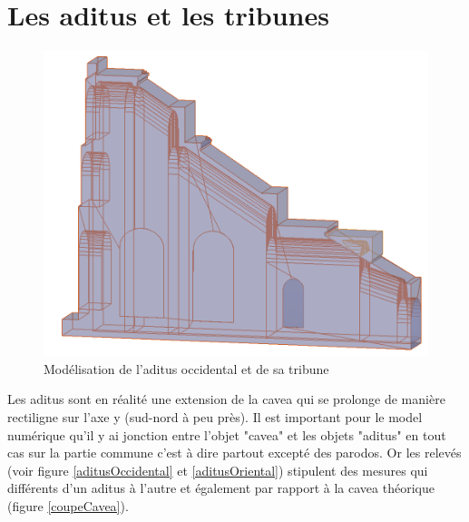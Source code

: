		
\section{Les \gls{aditus} et les tribunes} 

\begin{figure}[!h]
	\includegraphics[width=\linewidth]{images/modAditus}
	\caption{Modélisation de l'\gls{aditus} occidental et de sa tribune} 
	\label{modAditus} 
\end{figure}  
		
Les aditus sont en réalité une extension de la cavea qui se prolonge de manière rectiligne sur l'axe y (sud-nord à peu près). Il est important pour le model numérique qu'il y ai jonction entre l'objet "cavea" et les objets "aditus" en tout cas sur la partie commune c'est à dire partout excepté des \gls{parodos}. Or les relevés (voir figure \ref{aditusOccidental} et \ref{aditusOriental}) stipulent des mesures qui différents d'un aditus à l'autre et également par rapport à la cavea théorique (figure \ref{coupeCavea}).

